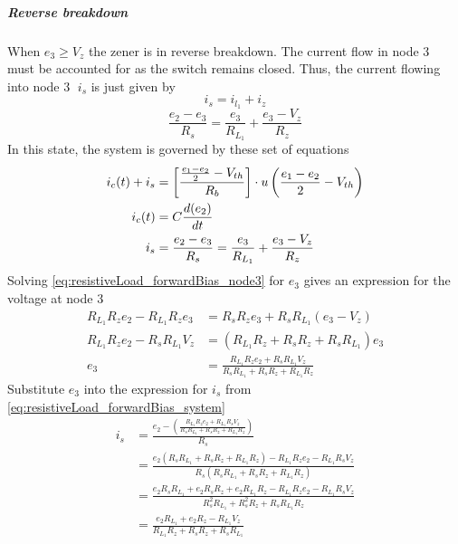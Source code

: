 \subparagraph{Reverse breakdown}
When $e_3 \geq V_z$ the zener is in reverse breakdown. The current flow in node \textcircled{3} must be accounted for as the switch remains closed. Thus, the current flowing into node \textcircled{3} $i_s$ is just given by $$i_s = i_{l_1} + i_z$$
\begin{equation}
	\frac{e_2-e_3}{R_s}=\frac{e_3}{R_{L_1}} + \frac{e_3 - V_z}{R_z}
	\label{eq:resistiveLoad_forwardBias_node3}
\end{equation}
In this state, the system is governed by these set of equations
\begin{equation}
	\begin{split}
    	i_c(t) + i_s &= \left[\frac{\frac{e_1 - e_2}{2} - V_{th}}{R_b} \right]\cdot u\left(\frac{e_1 - e_2}{2} - V_{th} \right)\\
    	i_c(t)&=C\frac{d(e_2)}{dt}\\
    	i_s&=\frac{e_2-e_3}{R_s}=\frac{e_3}{R_{L_1}} + \frac{e_3 - V_z}{R_z}
	\end{split}
	    \label{eq:resistiveLoad_forwardBias_system}
\end{equation}
Solving \eqref{eq:resistiveLoad_forwardBias_node3} for $e_3$ gives an expression for the voltage at node \textcircled{3}
\begin{equation}
\begin{split}
R_{L_1} R_z e_2 - R_{L_1} R_z e_3 &= R_s R_z e_3 + R_s R_{L_1} (e_3 - V_z) \\
R_{L_1} R_z e_2 - R_s R_{L_1} V_z &= (R_{L_1} R_z + R_s R_z + R_s R_{L_1}) e_3 \\
e_3 &= \frac{R_{L_1} R_z e_2 + R_s R_{L_1} V_z}{R_s R_{L_1} + R_s R_z + R_{L_1} R_z}
\end{split}
\end{equation}
Substitute $e_3$ into the expression for $i_s$ from \eqref{eq:resistiveLoad_forwardBias_system}
\begin{equation}
\begin{split}
i_s &= \frac{e_2 - \left(\frac{R_{L_1}R_z e_2 + R_{L_1}R_s V_z}{R_s R_{L_1} + R_s R_z + R_{L_1} R_z}\right)}{R_s} \\
&= \frac{e_2 (R_s R_{L_1} + R_s R_z + R_{L_1} R_z) - R_{L_1}R_z e_2 - R_{L_1}R_s V_z}{R_s (R_s R_{L_1} + R_s R_z + R_{L_1} R_z)} \\
&= \frac{e_2 R_s R_{L_1} + e_2 R_s R_z + e_2 R_{L_1} R_z - R_{L_1}R_z e_2 - R_{L_1}R_s V_z}{R_s^2 R_{L_1} + R_s^2 R_z + R_s R_{L_1} R_z} \\
&= \frac{e_2 R_{L_1} + e_2 R_z - R_{L_1} V_z}{R_{L_1} R_z + R_s R_z + R_s R_{L_1}}
\end{split}
\end{equation}
